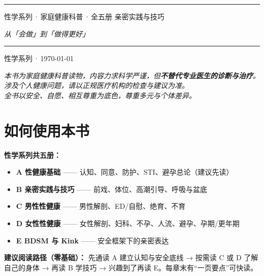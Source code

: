 \documentclass[12pt,UTF8,openany]{ctexbook}
\begin{document}
\begin{titlepage}
\centering
\vspace*{1.5cm}
\vspace{0.6cm}
\noindent\rule{\textwidth}{0.4pt}
\vspace{0.5cm}
\myhei{} 性学系列\,·\,家庭健康科普\,·\,全五册
\vspace{2.5cm}
\myhei{} 亲密实践与技巧\par
\vspace{1.2cm}
\itshape{} 从「会做」到「做得更好」\par
\vspace{5.2cm}
\noindent\rule{\textwidth}{0.4pt}
\vspace{0.5cm}
 性学系列\,·\,\today
\end{titlepage}

\begin{center}\itshape
本书为家庭健康科普读物，内容力求科学严谨，但\textbf{不替代专业医生的诊断与治疗}。\\
涉及个人健康问题，请以正规医疗机构的检查与建议为准。\\
全书以安全、自愿、相互尊重为底色，尊重多元与个体差异。\par\end{center}
\clearpage

\chapter*{如何使用本书}
\noindent\textbf{性学系列共五册：}
\begin{itemize}[leftmargin=2em]
\item \textbf{A 性健康基础} —— 认知、同意、防护、STI、避孕总论（建议先读）
\item \textbf{B 亲密实践与技巧} —— 前戏、体位、高潮引导、呼吸与盆底
\item \textbf{C 男性性健康} —— 男性解剖、ED/自慰、绝育、不育
\item \textbf{D 女性性健康} —— 女性解剖、妇科、不孕、人流、避孕、孕期/更年期
\item \textbf{E BDSM 与 Kink} —— 安全框架下的亲密表达
\end{itemize}
\vspace{0.6em}
\noindent\textbf{建议阅读路径（零基础）：} 先通读 A 建立认知与安全底线 → 按需读 C 或 D 了解自己的身体 → 再读 B 学技巧 → 兴趣到了再读 E。每章末有“一页要点”可快读。
\clearpage
\end{document}
